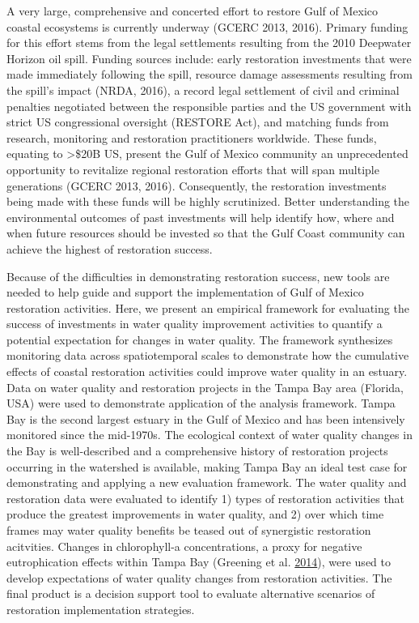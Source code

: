 \documentclass[]{article}
\begin{document}
A very large, comprehensive and concerted effort to restore Gulf of
Mexico coastal ecosystems is currently underway (GCERC 2013, 2016).
Primary funding for this effort stems from the legal settlements
resulting from the 2010 Deepwater Horizon oil spill. Funding sources
include: early restoration investments that were made immediately
following the spill, resource damage assessments resulting from the
spill's impact (NRDA, 2016), a record legal settlement of civil and
criminal penalties negotiated between the responsible parties and the US
government with strict US congressional oversight (RESTORE Act), and
matching funds from research, monitoring and restoration practitioners
worldwide. These funds, equating to \textgreater{}\$20B US, present the
Gulf of Mexico community an unprecedented opportunity to revitalize
regional restoration efforts that will span multiple generations (GCERC
2013, 2016). Consequently, the restoration investments being made with
these funds will be highly scrutinized. Better understanding the
environmental outcomes of past investments will help identify how, where
and when future resources should be invested so that the Gulf Coast
community can achieve the highest of restoration success.

Because of the difficulties in demonstrating restoration success, new
tools are needed to help guide and support the implementation of Gulf of
Mexico restoration activities. Here, we present an empirical framework
for evaluating the success of investments in water quality improvement
activities to quantify a potential expectation for changes in water
quality. The framework synthesizes monitoring data across spatiotemporal
scales to demonstrate how the cumulative effects of coastal restoration
activities could improve water quality in an estuary. Data on water
quality and restoration projects in the Tampa Bay area (Florida, USA)
were used to demonstrate application of the analysis framework. Tampa
Bay is the second largest estuary in the Gulf of Mexico and has been
intensively monitored since the mid-1970s. The ecological context of
water quality changes in the Bay is well-described and a comprehensive
history of restoration projects occurring in the watershed is available,
making Tampa Bay an ideal test case for demonstrating and applying a new
evaluation framework. The water quality and restoration data were
evaluated to identify 1) types of restoration activities that produce
the greatest improvements in water quality, and 2) over which time
frames may water quality benefits be teased out of synergistic
restoration acitvities. Changes in chlorophyll-a concentrations, a proxy
for negative eutrophication effects within Tampa Bay (Greening et al.
\protect\hyperlink{ref-Greening2014}{2014}), were used to develop
expectations of water quality changes from restoration activities. The
final product is a decision support tool to evaluate alternative
scenarios of restoration implementation strategies.
\end{document}

